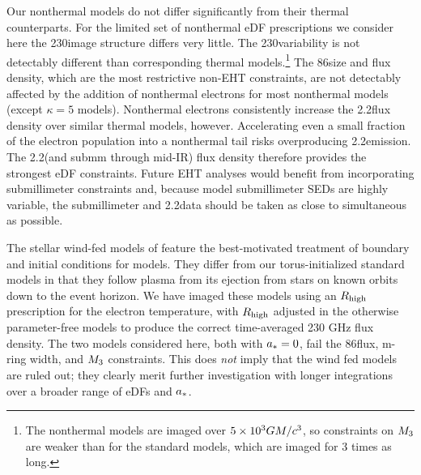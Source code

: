 Our nonthermal models do not differ significantly from their thermal counterparts.
For the limited set of nonthermal eDF prescriptions we consider here the 230\GHz image structure differs very little.  The 230\GHz variability is not detectably different than corresponding thermal models.\footnote{The nonthermal models are imaged over $5\times 10^3GM/c^3$, so constraints on $M_{3}$ are weaker than for the standard models, which are imaged for 3 times as long.}  The 86\GHz size and flux density, which are the most restrictive non-EHT constraints, are not detectably affected by the addition of nonthermal electrons for most nonthermal models (except $\kappa = 5$ models).  Nonthermal electrons consistently increase the 2.2\um flux density over similar thermal models, however.  Accelerating even a small fraction of the electron population into a nonthermal tail risks overproducing 2.2\um emission.  The 2.2\um (and submm through mid-IR) flux density therefore provides the strongest eDF constraints.  Future EHT analyses would benefit from incorporating submillimeter constraints \citep[e.g.]{2019ApJ...881L...2B} and, because model submillimeter SEDs are highly variable, the submillimeter and 2.2\um data  should be taken as close to simultaneous as possible.

The stellar wind-fed models of \cite{2020ApJ...896L...6R} feature the best-motivated treatment of boundary and initial conditions for \sgra models.  They differ from our torus-initialized standard models in that they follow plasma from its ejection from stars on known orbits down to the event horizon.  We have imaged these models using an $R_\mathrm{high}$ prescription for the electron temperature, with $R_\mathrm{high}$ adjusted in the otherwise parameter-free models to produce the correct time-averaged 230 GHz flux density.  The two models considered here, both with $a_* = 0$, fail the 86\GHz flux, m-ring width, and $M_{3}$ constraints.  This does {\em not} imply that the wind fed models are ruled out; they clearly merit further investigation with longer integrations over a broader range of eDFs and $a_*$.


